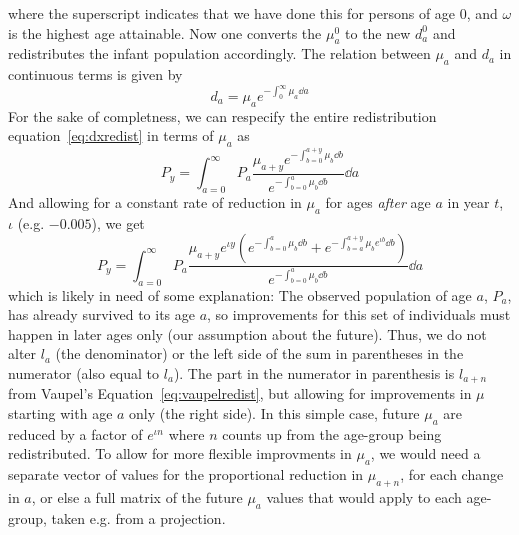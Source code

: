 where the superscript indicates that we have done this for persons of age 0, and
$\omega$ is the highest age attainable. Now one converts the $\mu _a^0$ to the
new $d_a^0$ and redistributes the infant population accordingly. The relation
between $\mu_a$ and $d_a$ in continuous terms is given by
\begin{equation}
d_a = \mu_a e^{-\int_0^\infty \mu_a \dd a}
\end{equation}
For the sake of completness, we can respecify the entire redistribution
equation~\eqref{eq:dxredist} in terms of $\mu_a$ as
\begin{equation}
P_y = \int _{a=0}^\infty P_a \frac{\mu_{a+y} e^{-\int_{b=0}^{a+y} \mu_b \dd
b}}{e^{-\int_{b=0}^a \mu_b \dd b}} \dd a
\end{equation}
And allowing for a constant rate of reduction in $\mu_a$ for ages \textit{after}
age $a$ in year $t$, $\iota$ (e.g. $-0.005$), we get
\begin{equation}
P_y = \int_{a=0}^\infty P_a \frac{\mu_{a+y}e^{\iota y} (e^{-\int_{b=0}^a\mu_b
\dd b}+e^{-\int_{b=a}^{a+y} \mu_b e^{\iota b} \dd b})}{e^{-\int_{b=0}^a \mu_b
\dd b}} \dd a
\end{equation}
which is likely in need of some explanation: The observed population of age $a$,
$P_a$, has already survived to its age $a$, so improvements for this set of
individuals must happen in later ages only (our assumption about the future).
Thus, we do not alter $l_a$ (the denominator) or the left side of the sum in
parentheses in the numerator (also equal to $l_a$). The part in the numerator in
parenthesis is $l_{a+n}$ from Vaupel's Equation~\eqref{eq:vaupelredist}, but allowing
for improvements in $\mu$ starting with age $a$ only (the right side). In this
simple case, future $\mu_a$ are reduced by a factor of $e^{\iota n}$ where 
$n$ counts up from the age-group being redistributed. To allow for more flexible
improvments in $\mu_a$, we would need a separate vector of values for the
proportional reduction in $\mu_{a+n}$, for each change in $a$, or else a full
matrix of the future $\mu_a$ values that would apply to each age-group, taken
e.g. from a projection.

